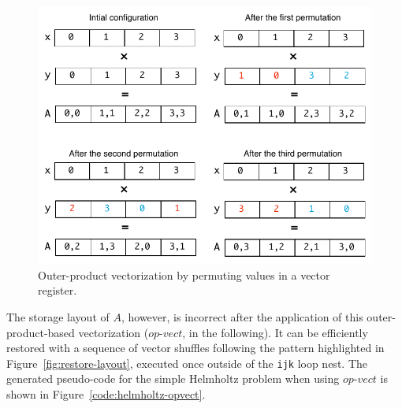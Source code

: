 \documentclass[conference]{IEEEtran}
\begin{document}

\begin{figure}[h]
\centerline{\includegraphics[scale=0.6]{Pictures/vect-by-vect.pdf}}
\caption{Outer-product vectorization by permuting values in a vector register.}
\label{fig:vect-by-vect}
\end{figure}

The storage layout of $A$, however, is incorrect after the application of this outer-product-based vectorization ($op$-$vect$, in the following). It can be efficiently restored with a sequence of vector shuffles following the pattern highlighted in Figure~\ref{fig:restore-layout}, executed once outside of the \texttt{ijk} loop nest. The generated pseudo-code for the simple Helmholtz problem when using $op$-$vect$ is shown in Figure~\ref{code:helmholtz-opvect}.
\end{document}
